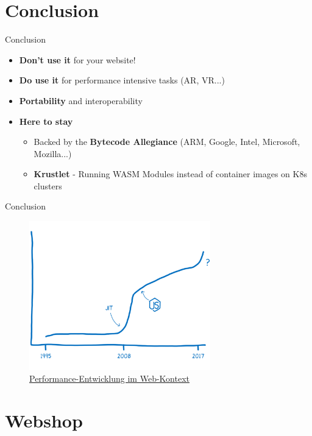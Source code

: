 \documentclass{beamer}
\begin{document}
\section{Conclusion}

\begin{frame}{Conclusion}
\begin{itemize}
    \item \textbf{Don't use it} for your website!
    \item \textbf{Do use it} for performance intensive tasks (AR, VR...)
    \item \textbf{Portability} and interoperability
    \item \textbf{Here to stay}
    \begin{itemize}
        \item Backed by the \textbf{Bytecode Allegiance} (ARM, Google, Intel, Microsoft, Mozilla...)
        \item \textbf{Krustlet} - Running WASM Modules instead of container images on K8s clusters
    \end{itemize}
\end{itemize}
\end{frame}

\begin{frame}{Conclusion}
    \begin{figure}
        \includegraphics[width=0.7\textwidth,height=0.7\textheight]{./images/perf_history.png}
        \caption{\href{https://hacks.mozilla.org/2017/02/a-cartoon-intro-to-webassembly/}{Performance-Entwicklung im Web-Kontext}}
    \end{figure}
\end{frame}

\section{Webshop}
    
\end{document}
